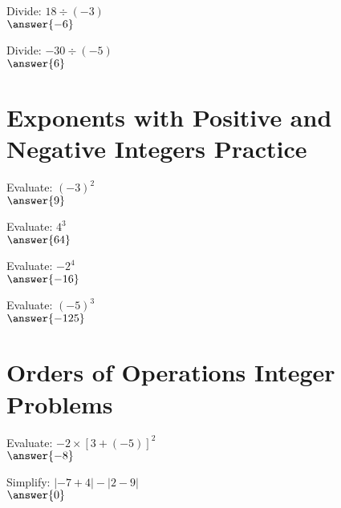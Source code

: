 \documentclass{ximera}
\begin{document}
\begin{problem}
Divide: $18 \div (-3)$\\
$\answer{-6}$
\end{problem}

\begin{problem}
Divide: $-30 \div (-5)$\\
$\answer{6}$
\end{problem}



\section*{Exponents with Positive and Negative Integers Practice}

\begin{problem}
Evaluate: $(-3)^2$\\
$\answer{9}$
\end{problem}

\begin{problem}
Evaluate: $4^3$\\
$\answer{64}$
\end{problem}

\begin{problem}
Evaluate: $-2^4$\\
$\answer{-16}$
\end{problem}

\begin{problem}
Evaluate: $(-5)^3$\\
$\answer{-125}$
\end{problem}



\section*{Orders of Operations Integer Problems}

\begin{problem}
Evaluate: $-2 \times [3 + (-5)]^2$\\
$\answer{-8}$
\end{problem}

\begin{problem}
Simplify: $| -7 + 4 | - | 2 - 9 |$\\
$\answer{0}$
\end{problem}
\end{document}
